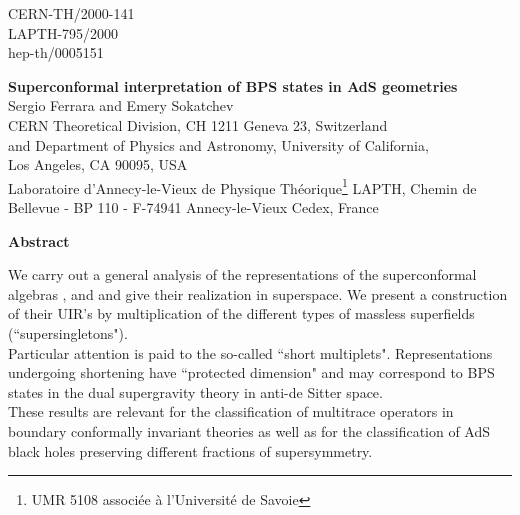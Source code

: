 \documentclass[a4paper,12pt]{article}
\begin{document}
\begin{titlepage}
\begin{flushright}
CERN-TH/2000-141\\ LAPTH-795/2000 \\ hep-th/0005151 
\end{flushright}
\vspace{.5cm} 
\begin{center}
{\Large\bf Superconformal interpretation of BPS states in AdS 
geometries}\\ \vfill {\large  Sergio Ferrara\myHighlight{$^\dagger$}\coordHE{} and Emery 
Sokatchev\myHighlight{$^\ddagger$}\coordHE{} }\\ \vfill  \vspace{6pt} \myHighlight{$^\dagger$}\coordHE{} CERN 
Theoretical Division, CH 1211 Geneva 23, Switzerland 
\\ and 
Department of Physics and Astronomy, University of California, \\ 
Los Angeles, CA 90095, USA 
\\ \vspace{6pt}
\myHighlight{$^\ddagger$}\coordHE{} Laboratoire d'Annecy-le-Vieux de Physique 
Th\'{e}orique\footnote[1]{UMR 5108 associ{\'e}e {\`a} 
 l'Universit{\'e} de Savoie} LAPTH, Chemin
de Bellevue - BP 110 - F-74941 Annecy-le-Vieux Cedex, France 


\end{center}
\vfill 

\begin{center}
{\bf Abstract} 
\end{center}
{\small We carry out a general analysis of the representations of 
the superconformal algebras \coordHE{}, 
\coordHE{} and \coordHE{} and give 
their realization in superspace. We present a construction of 
their UIR's by multiplication of the different types of massless 
superfields (``supersingletons"). 
\\ Particular attention is paid to the so-called ``short multiplets". 
Representations undergoing shortening have ``protected dimension" 
and may correspond to BPS states in the dual supergravity theory in 
anti-de Sitter space.\\ These results are relevant for the 
classification of multitrace operators in boundary conformally 
invariant theories as well as for the classification of AdS black 
holes preserving different fractions of supersymmetry.} 
\end{titlepage}
\end{document}
